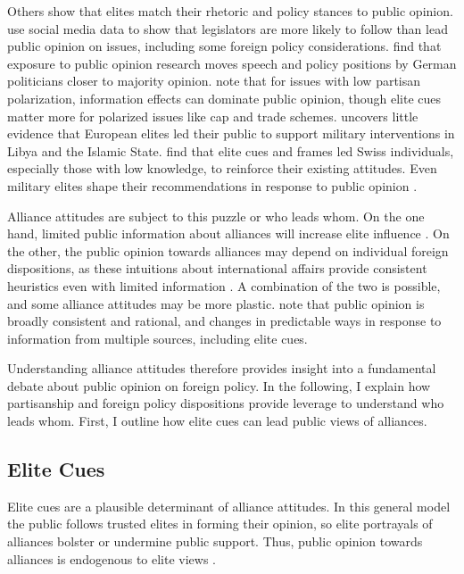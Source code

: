 \documentclass[12pt]{article}
\begin{document}
Others show that elites match their rhetoric and policy stances to public opinion. 
\citet{Barberaetal2019} use social media data to show that legislators are more likely to follow than lead public opinion on issues, including some foreign policy considerations. 
\citet{HagerHilbig2020} find that exposure to public opinion research moves speech and policy positions by German politicians closer to majority opinion. 
\citet{GuisingerSaunders2017} note that for issues with low partisan polarization, information effects can dominate public opinion, though elite cues matter more for polarized issues like cap and trade schemes. 
\citet{Haesebrouck2019} uncovers little evidence that European elites led their public to support military interventions in Libya and the Islamic State. 
\citet{Bechteletal2015} find that elite cues and frames led Swiss individuals, especially those with low knowledge, to reinforce their existing attitudes. 
Even military elites shape their recommendations in response to public opinion \citep{LinGreenberg2021}. 



Alliance attitudes are subject to this puzzle or who leads whom. 
On the one hand, limited public information about alliances will increase elite influence \citep{Druckman2001}. 
On the other, the public opinion towards alliances may depend on individual foreign dispositions, as these intuitions about international affairs provide consistent heuristics even with limited information \citep{Herrmannetal2009, KertzerZeitzoff2017}.
A combination of the two is possible, and some alliance attitudes may be more plastic. 
\citet{PageShapiro1992} note that public opinion is broadly consistent and rational, and changes in predictable ways in response to information from multiple sources, including elite cues. 


Understanding alliance attitudes therefore provides insight into a fundamental debate about public opinion on foreign policy.  
In the following, I explain how partisanship and foreign policy dispositions provide leverage to understand who leads whom.
First, I outline how elite cues can lead public views of alliances. 


\subsection{Elite Cues} 

Elite cues are a plausible determinant of alliance attitudes. 
In this general model the public follows trusted elites in forming their opinion, so elite portrayals of alliances bolster or undermine public support.
Thus, public opinion towards alliances is endogenous to elite views \citep{Druckman2014}.
\end{document}
